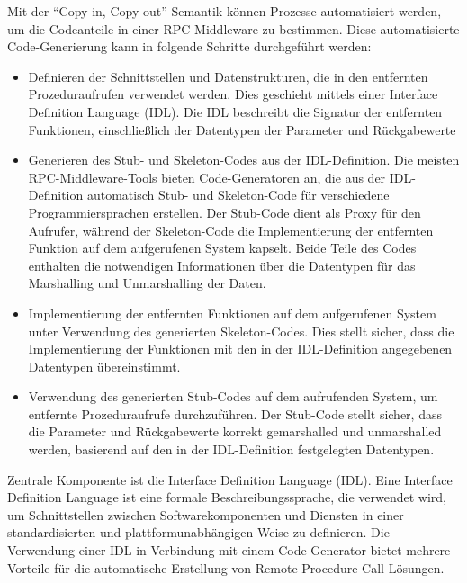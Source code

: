 Mit der \enquote{Copy in, Copy out} Semantik können Prozesse automatisiert werden, um die Codeanteile in einer RPC-Middleware zu bestimmen. Diese automatisierte Code-Generierung kann in folgende Schritte durchgeführt werden:
\begin{itemize} 
\item Definieren der Schnittstellen und Datenstrukturen, die in den entfernten Prozeduraufrufen verwendet werden. Dies geschieht mittels einer Interface Definition Language (IDL). Die IDL beschreibt die Signatur der entfernten Funktionen, einschließlich der Datentypen der Parameter und Rückgabewerte
\item Generieren des Stub- und Skeleton-Codes aus der IDL-Definition. Die meisten RPC-Middleware-Tools bieten Code-Generatoren an, die aus der IDL-Definition automatisch Stub- und Skeleton-Code für verschiedene Programmiersprachen erstellen. Der Stub-Code dient als Proxy für den Aufrufer, während der Skeleton-Code die Implementierung der entfernten Funktion auf dem aufgerufenen System kapselt. Beide Teile des Codes enthalten die notwendigen Informationen über die Datentypen für das Marshalling und Unmarshalling der Daten.
\item Implementierung der entfernten Funktionen auf dem aufgerufenen System unter Verwendung des generierten Skeleton-Codes. Dies stellt sicher, dass die Implementierung der Funktionen mit den in der IDL-Definition angegebenen Datentypen übereinstimmt.
\item  Verwendung des generierten Stub-Codes auf dem aufrufenden System, um entfernte Prozeduraufrufe durchzuführen. Der Stub-Code stellt sicher, dass die Parameter und Rückgabewerte korrekt gemarshalled und unmarshalled werden, basierend auf den in der IDL-Definition festgelegten Datentypen.
\end{itemize} 
Zentrale Komponente ist die  Interface Definition Language (IDL). Eine Interface Definition Language ist eine formale Beschreibungssprache, die verwendet wird, um Schnittstellen zwischen Softwarekomponenten und Diensten in einer standardisierten und plattformunabhängigen Weise zu definieren. Die Verwendung einer IDL in Verbindung mit einem Code-Generator bietet mehrere Vorteile für die automatische Erstellung von Remote Procedure Call Lösungen.

